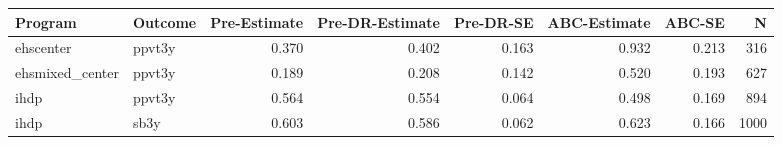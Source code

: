 \begin{table}[ht]
\centering
\begin{tabular}{llrrrrrr}
  \hline
Program & Outcome & Pre-Estimate & Pre-DR-Estimate & Pre-DR-SE & ABC-Estimate & ABC-SE & N \\ 
  \hline
ehscenter & ppvt3y & 0.370 & 0.402 & 0.163 & 0.932 & 0.213 & 316 \\ 
  ehsmixed\_center & ppvt3y & 0.189 & 0.208 & 0.142 & 0.520 & 0.193 & 627 \\ 
  ihdp & ppvt3y & 0.564 & 0.554 & 0.064 & 0.498 & 0.169 & 894 \\ 
  ihdp & sb3y & 0.603 & 0.586 & 0.062 & 0.623 & 0.166 & 1000 \\ 
   \hline
\end{tabular}
\end{table}
